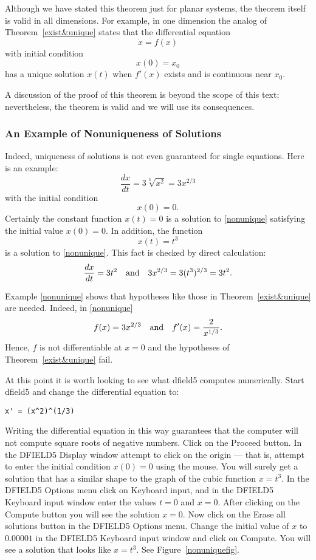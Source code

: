 \documentclass{ximera}
\begin{document}
Although we have stated this theorem just for planar systems, the theorem
itself is valid in all dimensions.   For example, in one dimension the analog
of Theorem~\ref{exist&unique} states that the differential equation
\[
\dot{x} = f(x)
\]
with initial condition
\[
x(0)=x_0
\]
has a unique solution $x(t)$ when $f'(x)$ exists and is
continuous near $x_0$.

A discussion of the proof of this theorem is beyond the scope of this text;
nevertheless, the theorem is valid and we will use its consequences.

\subsubsection*{An Example of Nonuniqueness of Solutions}

Indeed, uniqueness of solutions is not even
guaranteed for single equations.  Here is an example:
\begin{equation}  \label{nonunique}
\frac{dx}{dt} = 3\sqrt[3]{x^2} = 3x^{2/3}
\end{equation}
with the initial condition
\[
x(0)=0.
\]
Certainly the constant function $x(t)=0$ is a solution to \eqref{nonunique}
satisfying the initial value $x(0)=0$.  In addition, the function
\[
x(t) = t^3
\]
is a solution to \eqref{nonunique}.  This fact is checked by direct
calculation:
\[
\frac{dx}{dt} = 3t^2 \quad\mbox{and}\quad  3x^{2/3}= 3(t^3)^{2/3} = 3t^2.
\]

Example \eqref{nonunique} shows that hypotheses like those in
Theorem~\ref{exist&unique} are needed.  Indeed, in \eqref{nonunique}
\[
f(x)=3x^{2/3} \quad\mbox{and}\quad f'(x) = \frac{2}{x^{1/3}}.
\]
Hence, $f$ is not differentiable at $x=0$ and the hypotheses of
Theorem~\ref{exist&unique} fail.

At this point it is worth looking to see what {\sf dfield5}
computes numerically.  Start {\sf dfield5}  and
change the differential equation to:
\begin{verbatim}
x' = (x^2)^(1/3)
\end{verbatim}
Writing the differential equation in this way guarantees that
the computer will not compute square roots of negative numbers.
Click on the {\sf Proceed} button.  In the {\sf DFIELD5 Display}
window attempt to click on the origin --- that is, attempt to
enter the initial condition $x(0)=0$ using the mouse.  You will surely get
a solution that has a similar shape to the graph of the cubic function
$x=t^3$.  In the {\sf DFIELD5 Options} menu click on {\sf Keyboard input},
and in the {\sf DFIELD5 Keyboard input} window enter the
values $t=0$ and $x=0$.  After clicking on the {\sf Compute}
button you will see the solution $x=0$.  Now click on the {\sf
Erase all solutions} button in the {\sf DFIELD5 Options} menu.
Change the initial value of $x$ to $0.00001$ in the {\sf DFIELD5
Keyboard input} window and click on {\sf Compute}.  You will see
a solution that looks like $x=t^3$.  See Figure~\ref{nonuniquefig}.
\end{document}
